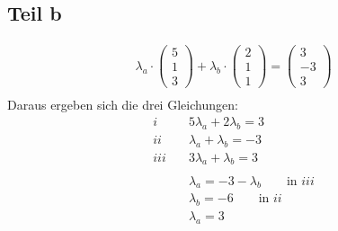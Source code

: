 \documentclass[a4paper,10pt]{extarticle}
\begin{document}
  \subsection*{Teil b}
  \begin{align*}
  \lambda_a \cdot \begin{pmatrix}5\\1\\3\end{pmatrix} + \lambda_b \cdot \begin{pmatrix}2\\1\\1\end{pmatrix} = \begin{pmatrix}3\\-3\\3\end{pmatrix} \\
  \end{align*} 
  Daraus ergeben sich die drei Gleichungen:
  \begin{align*}
  i \quad& 5\lambda_a + 2\lambda_b = 3 \\
  ii \quad& \lambda_a + \lambda_b = -3 \\
  iii \quad& 3\lambda_a + \lambda_b = 3 \\ \\
  & \lambda_a = - 3 - \lambda_b \qquad \mbox{in }iii \\
  & \lambda_b = -6 \qquad \mbox{in }ii \\
  & \lambda_a = 3
  \end{align*}
\end{document}
